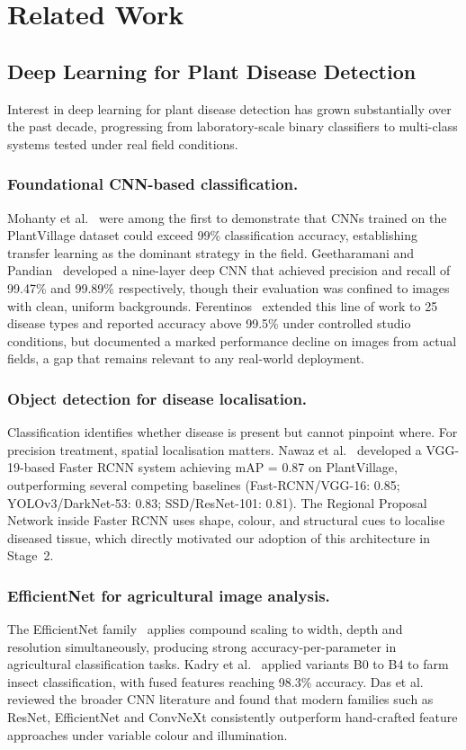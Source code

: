\section{Related Work}
\label{sec:related}

\subsection{Deep Learning for Plant Disease Detection}

Interest in deep learning for plant disease detection has grown
substantially over the past decade, progressing from laboratory-scale
binary classifiers to multi-class systems tested under real field
conditions.

\subsubsection*{Foundational CNN-based classification.}
Mohanty et al.~\cite{mohanty2016} were among the first to demonstrate
that CNNs trained on the PlantVillage dataset could exceed 99\%
classification accuracy, establishing transfer learning as the
dominant strategy in the field.
Geetharamani and Pandian~\cite{geetharamani2019} developed a
nine-layer deep CNN that achieved precision and recall of 99.47\% and
99.89\% respectively, though their evaluation was confined to images
with clean, uniform backgrounds.
Ferentinos~\cite{ferentinos2018} extended this line of work to
25 disease types and reported accuracy above 99.5\% under controlled
studio conditions, but documented a marked performance decline on
images from actual fields, a gap that remains relevant to any
real-world deployment.

\subsubsection*{Object detection for disease localisation.}
Classification identifies whether disease is present but cannot
pinpoint where. For precision treatment, spatial localisation matters.
Nawaz et al.~\cite{nawaz2023} developed a VGG-19-based Faster RCNN
system achieving mAP = 0.87 on PlantVillage, outperforming several
competing baselines (Fast-RCNN/VGG-16: 0.85; YOLOv3/DarkNet-53:
0.83; SSD/ResNet-101: 0.81).
The Regional Proposal Network inside Faster RCNN uses shape, colour,
and structural cues to localise diseased tissue, which directly
motivated our adoption of this architecture in Stage~2.

\subsubsection*{EfficientNet for agricultural image analysis.}
The EfficientNet family~\cite{efficientnet} applies compound scaling
to width, depth and resolution simultaneously, producing strong
accuracy-per-parameter in agricultural classification tasks.
Kadry et al.~\cite{kadry2025} applied variants B0 to B4 to farm insect
classification, with fused features reaching 98.3\% accuracy.
Das et al.~\cite{das2024} reviewed the broader CNN literature and
found that modern families such as ResNet, EfficientNet and ConvNeXt
consistently outperform hand-crafted feature approaches under variable
colour and illumination.

